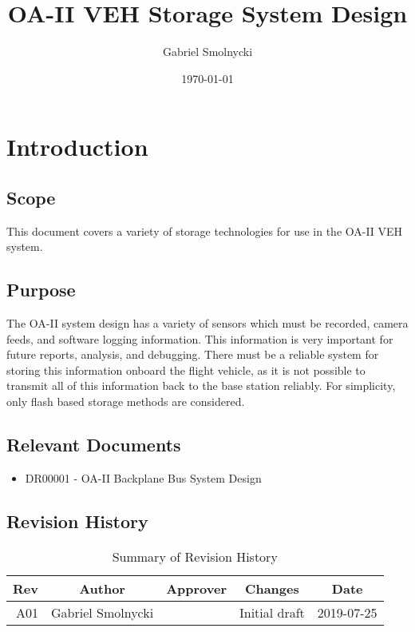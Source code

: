 \documentclass[12pt,article]{memoir}
\title{OA-II VEH Storage System Design}
\author{Gabriel Smolnycki}
\date{\today}
\begin{document}
	


\tableofcontents*
\clearpage


\chapter{Introduction}
\section{Scope}
This document covers a variety of storage technologies for use in the OA-II VEH system.

\section{Purpose}
The OA-II system design has a variety of sensors which must be recorded, camera feeds, and software logging information. This information is very important for future reports, analysis, and debugging. There must be a reliable system for storing this information onboard the flight vehicle, as it is not possible to transmit all of this information back to the base station reliably. For simplicity, only flash based storage methods are considered.

\section{Relevant Documents}
\begin{itemize}
	\item DR00001 - OA-II Backplane Bus System Design
\end{itemize}

\section{Revision History}
\begin{table}[H]
	\centering
	\begin{tabu}{r || c | c | c | c }
		Rev & Author & Approver & Changes & Date\\ \hline
		A01 & Gabriel Smolnycki & & Initial draft & 2019-07-25 \\
	\end{tabu}
	\caption{Summary of Revision History}
	\label{tab:rev}
\end{table}
\end{document}
